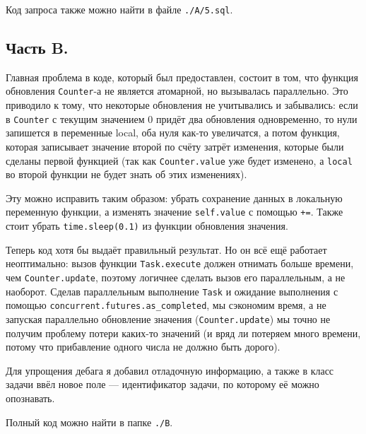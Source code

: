 \documentclass[a4paper, 12pt]{article}
\begin{document}
Код запроса также можно найти в файле \texttt{./A/5.sql}.


\begin{center}



\section*{Часть B.}
\end{center}

Главная проблема в коде, который был предоставлен, состоит в том, что функция обновления \texttt{Counter}-а не является атомарной, но вызывалась параллельно. Это приводило к тому, что некоторые обновления не учитывались и забывались: если в \texttt{Counter} с текущим значением 0 придёт два обновления одновременно, то нули запишется в переменные local, оба нуля как-то увеличатся, а потом функция, которая записывает значение второй по счёту затрёт изменения, которые были сделаны первой функцией (так как \texttt{Counter.value} уже будет изменено, а \texttt{local} во второй функции не будет знать об этих изменениях).

Эту можно исправить таким образом: убрать сохранение данных в локальную переменную функции, а изменять значение  \texttt{self.value} с помощью \texttt{+=}. Также стоит убрать \linebreak\texttt{time.sleep(0.1)} из функции обновления значения.

Теперь код хотя бы выдаёт правильный результат. Но он всё ещё работает неоптимально: вызов функции \texttt{Task.execute} должен отнимать больше времени, чем \texttt{Counter.update}, поэтому логичнее сделать вызов его параллельным, а не наоборот. Сделав параллельным выполнение \texttt{Task} и ожидание выполнения с помощью \texttt{concurrent.futures.as\_completed}, мы сэкономим время, а не запуская параллельно обновление значения (\texttt{Counter.update}) мы точно не получим проблему потери каких-то значений (и вряд ли потеряем много времени, потому что прибавление одного числа не должно быть дорого).

Для упрощения дебага я добавил отладочную информацию, а также в класс задачи ввёл новое поле --- идентификатор задачи, по которому её можно опознавать.

Полный код можно найти в папке \texttt{./B}.
\end{document}
